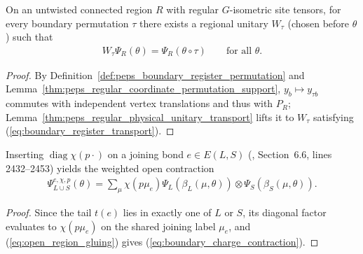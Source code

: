 \begin{lemma}
    \label{thm:peps_regular_boundary_register_transport}
    \leanok
    On an untwisted connected region $R$ with regular $G$-isometric site tensors, for every boundary permutation $\tau$ there exists a regional unitary $W_\tau$ (chosen before $\theta$) such that
    \begin{align}
        W_\tau\Psi_R(\theta)=\Psi_R(\theta\circ\tau)
        \qquad\text{for all }\theta. \label{eq:boundary_register_transport}
    \end{align}
\end{lemma}
\begin{proof}\leanok
    By Definition~\ref{def:peps_boundary_register_permutation} and Lemma~\ref{thm:peps_regular_coordinate_permutation_support}, $y_b\mapsto y_{\tau b}$ commutes with independent vertex translations and thus with $P_R$; Lemma~\ref{thm:peps_regular_physical_unitary_transport} lifts it to $W_\tau$ satisfying (\ref{eq:boundary_register_transport}).
\end{proof}

\begin{lemma}
    \label{thm:peps_regular_boundary_charge_contraction}
    \leanok
    Inserting $\operatorname{diag}\chi(p\cdot)$ on a joining bond $e\in E(L,S)$ (\cite{Schuch2010PEPS}, Section~6.6, lines 2432--2453) yields the weighted open contraction
    \begin{align}
        \Psi_{L\cup S}^{e,\chi,p}(\theta)
        =\sum_\mu\chi(p\mu_e)
        \Psi_L(\beta_L(\mu,\theta))\otimes
        \Psi_S(\beta_S(\mu,\theta)). \label{eq:boundary_charge_contraction}
    \end{align}
\end{lemma}
\begin{proof}\leanok
    Since the tail $t(e)$ lies in exactly one of $L$ or $S$, its diagonal factor evaluates to $\chi(p\mu_e)$ on the shared joining label $\mu_e$, and (\ref{eq:open_region_gluing}) gives (\ref{eq:boundary_charge_contraction}).
\end{proof}

